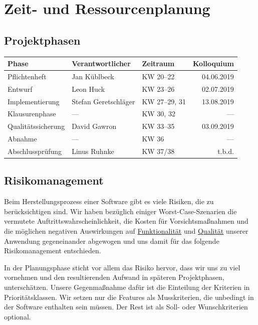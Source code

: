 \documentclass[parskip=full]{scrartcl}
\begin{document}
\clearpage
\section{Zeit- und Ressourcenplanung}\label{zeit}

\subsection{Projektphasen} \label{projektphasen}

\begin{tabular}{| l | l | l | r |}
	\hline
	\textbf{Phase} & \textbf{Verantwortlicher} & \textbf{Zeitraum} & \textbf{Kolloquium} \\ \hline
	Pflichtenheft & Jan Küblbeck & KW 20–22 & 04.06.2019 \\
	Entwurf & Leon Huck & KW 23–26 & 02.07.2019 \\
	Implementierung & Stefan Geretschläger & KW 27–29, 31 & 13.08.2019 \\
	Klausurenphase & — & KW 30, 32 & — \\
	Qualitätssicherung & David Gawron & KW 33–35 & 03.09.2019 \\
	Abnahme & — & KW 36 & — \\
	Abschlussprüfung & Linus Ruhnke & KW 37/38 & t.b.d. \\
	\hline
\end{tabular}

\subsection{Risikomanagement}

Beim Herstellungsprozess einer Software gibt es viele Risiken, die zu berücksichtigen sind. Wir haben bezüglich einiger Worst-Case-Szenarien die vermutete Auftrittswahrscheinlichkeit, die Kosten für Vorsichtsmaßnahmen und die möglichen negativen Auswirkungen auf \hyperref[funktionale]{Funktionalität}  und \hyperref[quali]{Qualität} unserer Anwendung gegeneinander abgewogen und uns damit für das folgende Risikomanagement entschieden. 

In der Planungsphase sticht vor allem das Risiko hervor, dass wir uns zu viel vornehmen und den resultierenden Aufwand in späteren Projektphasen, unterschätzen. Unsere Gegenmaßnahme dafür ist die Einteilung der Kriterien in Prioritätsklassen. Wir setzen nur die Features als Musskriterien, die unbedingt in der Software enthalten sein müssen. Der Rest ist als Soll- oder Wunschkriterien optional.
 
\end{document}
